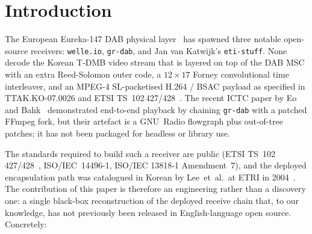 \documentclass[conference,letterpaper,10pt]{IEEEtran}
\begin{document}
\section{Introduction}

The European Eureka-147 DAB physical layer~\cite{etsi300401} has
spawned three notable open-source receivers: \texttt{welle.io},
\texttt{gr-dab}, and Jan van Katwijk's \texttt{eti-stuff}.  None
decode the Korean T-DMB video stream that is layered on top of
the DAB MSC with an extra Reed-Solomon outer code, a
$12\times17$ Forney convolutional time interleaver, and an MPEG-4
SL-packetised H.264 / BSAC payload as specified in
TTAK.KO-07.0026 and ETSI TS~102\,427/428~\cite{etsi102427,etsi102428}.
The recent ICTC paper by Eo and Bahk~\cite{eo2024tdmb} demonstrated
end-to-end playback by chaining \texttt{gr-dab} with a patched
FFmpeg fork, but their artefact is a GNU~Radio flowgraph plus
out-of-tree patches; it has not been packaged for headless or
library use.

The standards required to build such a receiver are public
(ETSI TS~102\,427/428~\cite{etsi102427,etsi102428},
ISO/IEC~14496-1, ISO/IEC 13818-1 Amendment~7), and the deployed
encapsulation path was catalogued in Korean by Lee~et~al.\ at
ETRI in 2004~\cite{lee2004m4smux}.  The contribution of this paper
is therefore an engineering rather than a discovery one: a single
black-box reconstruction of the deployed receive chain that, to
our knowledge, has not previously been released in English-language
open source.  Concretely:
\end{document}
